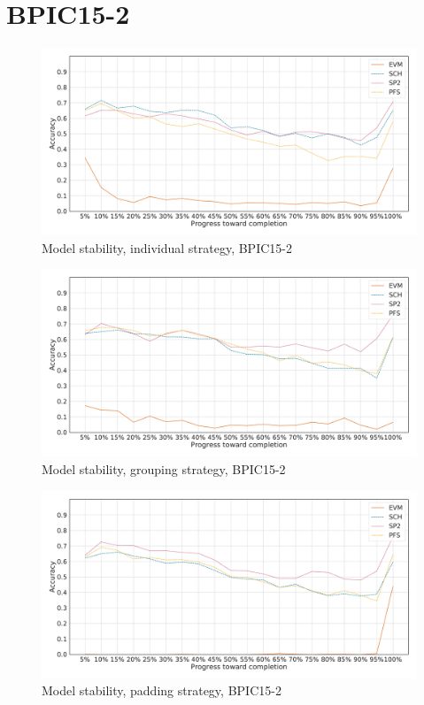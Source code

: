 \section*{BPIC15-2}\label{appendix:stability:2015-2}
\begin{figure}[!htb]
    \centering
    \includegraphics[width=\textwidth]{gfx/bpic2015_2/individual_stability.pdf}
    \caption{Model stability, individual strategy, BPIC15-2}
    \label{fig:bpic15-2-individual-stability}
\end{figure}
\begin{figure}[!htb]
    \centering
    \includegraphics[width=\textwidth]{gfx/bpic2015_2/grouped_stability.pdf}
    \caption{Model stability, grouping strategy, BPIC15-2}
    \label{fig:bpic15-2-grouped-stability}
\end{figure}
\begin{figure}[!htb]
    \centering
    \includegraphics[width=\textwidth]{gfx/bpic2015_2/padded_stability.pdf}
    \caption{Model stability, padding strategy, BPIC15-2}
    \label{fig:bpic15-2-padded-stability}
\end{figure}
